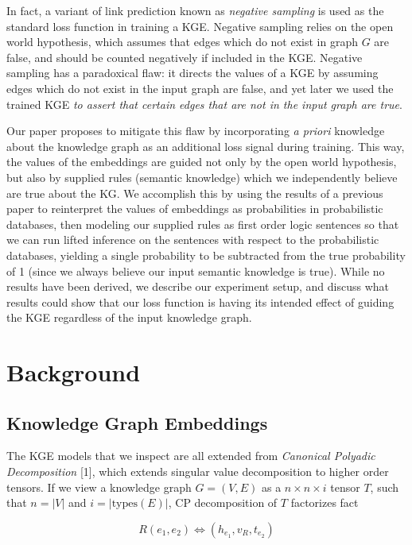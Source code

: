 \documentclass{article}
\begin{document}
In fact, a variant of link prediction known as \textit{negative sampling} is
used as the standard loss function in training a KGE. Negative sampling relies
on the open world hypothesis, which assumes that edges which do not exist in
graph \(G\) are false, and should be counted negatively if included in the KGE.
Negative sampling has a paradoxical flaw: it directs the values of a KGE by
assuming edges which do not exist in the input graph are false, and yet later we
used the trained KGE \textit{to assert that certain edges that are not in the
input graph are true}. 

Our paper proposes to mitigate this flaw by incorporating \textit{a priori}
knowledge about the knowledge graph as an additional loss signal during
training. This way, the values of the embeddings are guided not only by the open
world hypothesis, but also by supplied rules (semantic knowledge) which we
independently believe are true about the KG. We accomplish this by using the
results of a previous paper to reinterpret the values of embeddings as
probabilities in probabilistic databases, then modeling our supplied rules as
first order logic sentences so that we can run lifted inference on the sentences
with respect to the probabilistic databases, yielding a single probability to be
subtracted from the true probability of 1 (since we always believe our input
semantic knowledge is true). While no results have been derived, we describe our
experiment setup, and discuss what results could show that our loss function is
having its intended effect of guiding the KGE regardless of the input knowledge
graph.

\section{Background}

\subsection{Knowledge Graph Embeddings}

The KGE models that we inspect are all extended from \textit{Canonical Polyadic
Decomposition} [1], which extends singular value decomposition to higher order
tensors. If we view a knowledge graph \(G = (V, E)\) as a \(n \times n \times
i\) tensor \(T\), such that \(n = |V|\) and \(i = |\textrm{types}(E)|\), CP
decomposition of \(T\) factorizes fact

\[ R(e_1, e_2) \iff (h_{e_1}, v_R, t_{e_2}) \]
\end{document}
